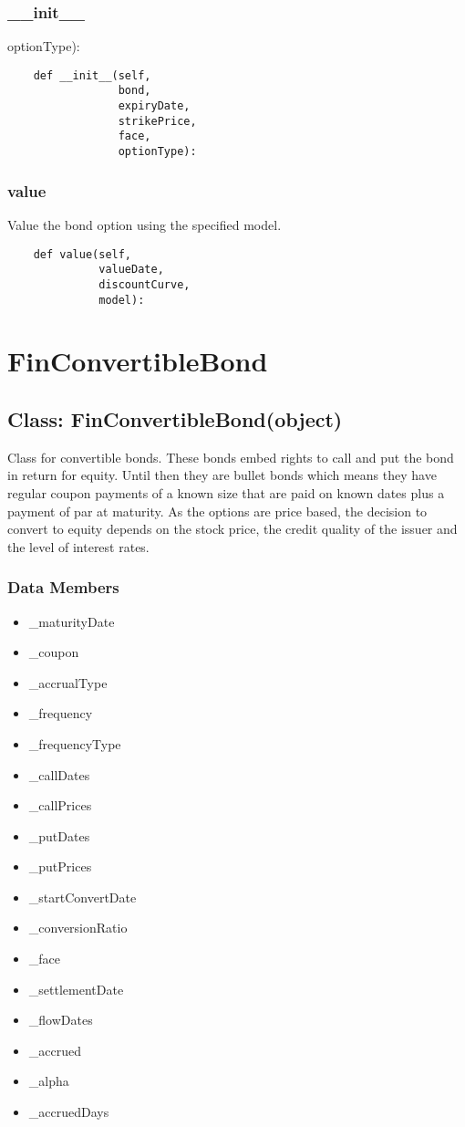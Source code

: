 \documentclass[twoside,11pt]{book}
\begin{document}
\subsubsection*{{\bf \_\_init\_\_}}
optionType): 

\begin{lstlisting}
    def __init__(self,
                 bond,
                 expiryDate,
                 strikePrice,
                 face,
                 optionType):
\end{lstlisting}

\subsubsection*{{\bf value}}
Value the bond option using the specified model.  

\begin{lstlisting}
    def value(self,
              valueDate,
              discountCurve,
              model):
\end{lstlisting}

\newpage
\section{FinConvertibleBond}

\subsection*{Class: FinConvertibleBond(object)}
Class for convertible bonds. These bonds embed rights to call and put the bond in return for equity. Until then they are bullet bonds which means they have regular coupon payments of a known size that are paid on known dates plus a payment of par at maturity. As the options are price based, the decision to convert to equity depends on the stock price, the credit quality of the issuer and the level of interest rates. 

\subsubsection*{Data Members}
\begin{itemize}
\item{\_maturityDate}
\item{\_coupon}
\item{\_accrualType}
\item{\_frequency}
\item{\_frequencyType}
\item{\_callDates}
\item{\_callPrices}
\item{\_putDates}
\item{\_putPrices}
\item{\_startConvertDate}
\item{\_conversionRatio}
\item{\_face}
\item{\_settlementDate}
\item{\_flowDates}
\item{\_accrued}
\item{\_alpha}
\item{\_accruedDays}
\end{itemize}
\end{document}
